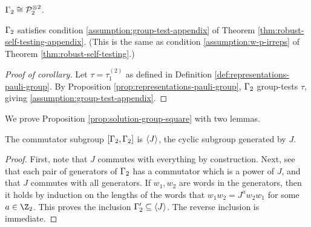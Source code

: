 \begin{prop}\label{prop:solution-group-square}
	$\Gamma_2\cong \mathcal{P}_{2}^{\otimes 2}$.
\end{prop}

\begin{cor}\label{cor:G2-satisfies-conditions-4-5}
	$\Gamma_2$ satisfies condition \eqref{assumption:group-test-appendix} of Theorem \ref{thm:robust-self-testing-appendix}. (This is the same as condition \eqref{assumption:w-p-irreps} of Theorem \ref{thm:robust-self-testing}.)
\end{cor}
\begin{proof}[Proof of corollary]
	Let $\tau = \tau_1^{(2)}$ as defined in Definition \ref{def:representations-pauli-group}. By Proposition \ref{prop:representations-pauli-group}, $\Gamma_2$ group-tests $\tau$, giving \eqref{assumption:group-test-appendix}.
\end{proof}

We prove Proposition \ref{prop:solution-group-square} with two lemmas.

\begin{lemma}\label{lemma:commutator-subgroup-square}
	The commutator subgroup $[\Gamma_2,\Gamma_2]$ is $\Braket J$, 
	the cyclic subgroup generated by $J$.
\end{lemma}
\begin{proof}
	First, note that $J$ commutes with everything by construction.
	Next, see that each pair of generators of $\Gamma_2$ has a commutator which is a power of $J$, and that $J$ commutes with all generators. If $w_1,w_2$ are words in the generators, then it holds by induction on the lengths of the words that $w_1w_2 = J^aw_2w_1$ for some $a\in \Z_2$. This proves the inclusion $\Gamma_2' \subseteq \Braket J$. The reverse inclusion is immediate.
\end{proof}

